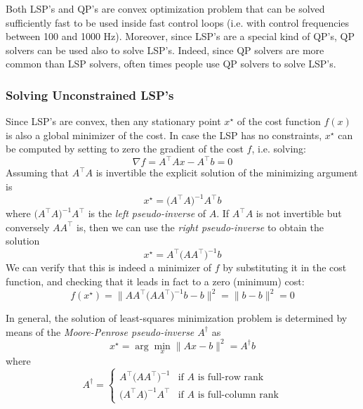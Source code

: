 	Both LSP's and QP's are convex optimization problem that can be solved sufficiently fast to be used inside fast control loops (i.e. with control frequencies between 100 and 1000 Hz). 
	Moreover, since LSP's are a special kind of QP's, QP solvers can be used also to solve LSP's. 
	Indeed, since QP solvers are more common than LSP solvers, often times people use QP solvers to solve LSP's.
	
	\subsubsection{Solving Unconstrained LSP's}
	Since LSP's are convex, then any stationary point $x^\star$ of the cost function $f(x)$ is also a global minimizer of the cost.
	In case the LSP has no constraints, $x^\star$ can be computed by setting to zero the gradient of the cost $f$, i.e. solving:
	\[ \nabla f = A^\top A x - A^\top b = 0 \]
	Assuming that $A^\top A$ is invertible the explicit solution of the minimizing argument is
	\begin{equation*} \tag{$\dagger$}
		x^\star = \big(A^\top A\big)^{-1} A^\top b
	\end{equation*}
	where $\big(A^\top A\big)^{-1} A^\top$ is the \textit{left pseudo-inverse} of $A$. If $A^\top A$ is not invertible but conversely $AA^\top$ is, then we can use the \textit{right pseudo-inverse} to obtain the solution
	\begin{equation*} \tag{$\ddagger$}
		x^\star = A^\top \big(AA^\top\big)^{-1} b
	\end{equation*}
	We can verify that this is indeed a minimizer of $f$ by substituting it in the cost function, and checking that it leads in fact to a zero (minimum) cost:
	\[ f(x^\star) =\big\| AA^\top\big(AA^\top\big)^{-1} b - b \big\|^2 = \|b-b\|^2 = 0 \]
	
	In general, the solution of least-squares minimization problem is determined by means of the \textit{Moore-Penrose pseudo-inverse $A^\dagger$} as
	\begin{equation} \label{eq:lspsol}
		x^\star = \arg \min_x \big\| Ax - b \big\|^2 = A^\dagger b
	\end{equation}
	where
	\begin{equation}
		A^\dagger = \begin{cases}
			A^\top\big(AA^\top\big)^{-1} & \textrm{if $A$ is full-row rank} \\
			\big(A^\top A\big)^{-1}A^\top & \textrm{if $A$ is full-column rank} 
		\end{cases}
	\end{equation}
	
